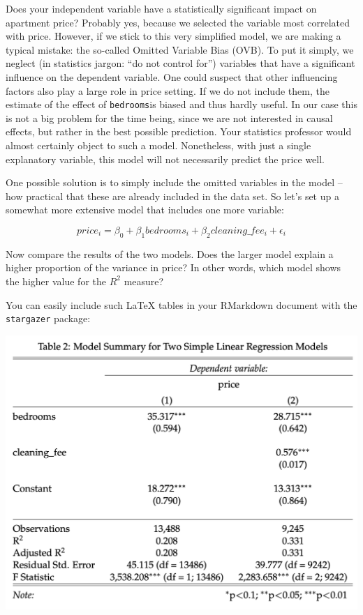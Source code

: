 \documentclass[
  11pt,
]{article}
\newenvironment{tips}[1]
  {
  \begin{itemize}
  \footnotesize
  \renewcommand{\labelitemi}{
    \raisebox{-.7\height}[0pt][0pt]{
      {\setkeys{Gin}{width=3em,keepaspectratio}
        \texttt{[image: images/\#1.png]}}
    }
  }
  \setlength{\fboxsep}{1em}
  \begin{rbox}
  \item
  }
  {
  \end{rbox}
  \end{itemize}
  }
\begin{document}
Does your independent variable have a statistically significant impact on apartment price? Probably yes, because we selected the variable most correlated with price. However, if we stick to this very simplified model, we are making a typical mistake: the so-called Omitted Variable Bias (OVB). To put it simply, we neglect (in statistics jargon: ``do not control for'') variables that have a significant influence on the dependent variable. One could suspect that other influencing factors also play a large role in price setting. If we do not include them, the estimate of the effect of \texttt{bedrooms}is biased and thus hardly useful. In our case this is not a big problem for the time being, since we are not interested in causal effects, but rather in the best possible prediction. Your statistics professor would almost certainly object to such a model. Nonetheless, with just a single explanatory variable, this model will not necessarily predict the price well.

One possible solution is to simply include the omitted variables in the model -- how practical that these are already included in the data set. So let's set up a somewhat more extensive model that includes one more variable:

\[price_i = \beta_0 + \beta_1 bedrooms_i + \beta_2 cleaning\_fee_i + \epsilon_i\]

Now compare the results of the two models. Does the larger model explain a higher proportion of the variance in price? In other words, which model shows the higher value for the \(R^2\) measure?

\begin{tips}r

You can easily include such LaTeX tables in your RMarkdown document with the \texttt{stargazer} package:

\begin{center}\includegraphics[width=1\linewidth]{plot/5_table} \end{center}

\end{tips}
\end{document}
